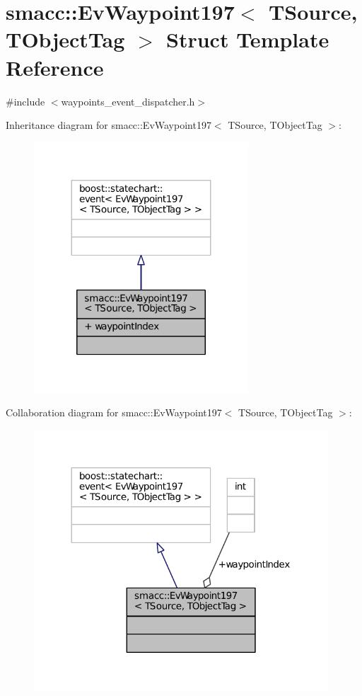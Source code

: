 \hypertarget{structsmacc_1_1EvWaypoint197}{}\section{smacc\+:\+:Ev\+Waypoint197$<$ T\+Source, T\+Object\+Tag $>$ Struct Template Reference}
\label{structsmacc_1_1EvWaypoint197}


{\ttfamily \#include $<$waypoints\+\_\+event\+\_\+dispatcher.\+h$>$}



Inheritance diagram for smacc\+:\+:Ev\+Waypoint197$<$ T\+Source, T\+Object\+Tag $>$\+:
\nopagebreak
\begin{figure}[H]
\begin{center}
\leavevmode
\includegraphics[width=227pt]{structsmacc_1_1EvWaypoint197__inherit__graph}
\end{center}
\end{figure}


Collaboration diagram for smacc\+:\+:Ev\+Waypoint197$<$ T\+Source, T\+Object\+Tag $>$\+:
\nopagebreak
\begin{figure}[H]
\begin{center}
\leavevmode
\includegraphics[width=312pt]{structsmacc_1_1EvWaypoint197__coll__graph}
\end{center}
\end{figure}
